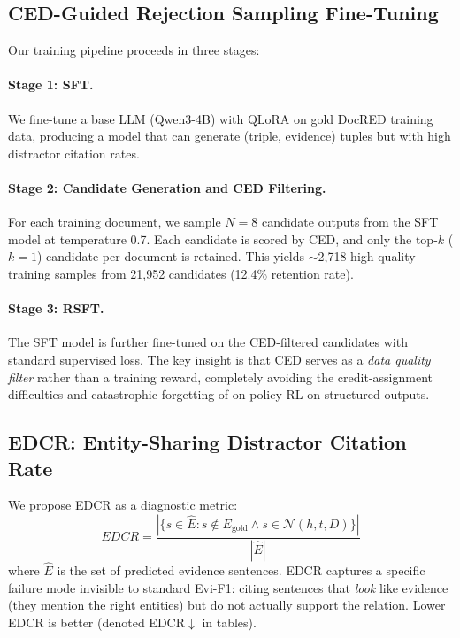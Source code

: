 \documentclass[11pt,a4paper]{article}
\newcommand{\ced}{CED}
\newcommand{\edcr}{EDCR}
\newcommand{\rsft}{RSFT}
\begin{document}
\subsection{\ced{}-Guided Rejection Sampling Fine-Tuning}

Our training pipeline proceeds in three stages:

\paragraph{Stage 1: SFT.}
We fine-tune a base LLM (Qwen3-4B) with QLoRA on gold DocRED training data, producing a model that can generate (triple, evidence) tuples but with high distractor citation rates.

\paragraph{Stage 2: Candidate Generation and \ced{} Filtering.}
For each training document, we sample $N=8$ candidate outputs from the SFT model at temperature 0.7.
Each candidate is scored by \ced{}, and only the top-$k$ ($k=1$) candidate per document is retained.
This yields ${\sim}$2,718 high-quality training samples from 21,952 candidates (12.4\% retention rate).

\paragraph{Stage 3: \rsft{}.}
The SFT model is further fine-tuned on the \ced{}-filtered candidates with standard supervised loss.
The key insight is that \ced{} serves as a \emph{data quality filter} rather than a training reward, completely avoiding the credit-assignment difficulties and catastrophic forgetting of on-policy RL on structured outputs.

\subsection{\edcr{}: Entity-Sharing Distractor Citation Rate}
\label{sec:edcr}

We propose \edcr{} as a diagnostic metric:
\begin{equation}
\edcr{} = \frac{|\{s \in \hat{E} : s \notin E_{\text{gold}} \wedge s \in \mathcal{N}(h,t,D)\}|}{|\hat{E}|}
\end{equation}
where $\hat{E}$ is the set of predicted evidence sentences.
\edcr{} captures a specific failure mode invisible to standard Evi-F1: citing sentences that \emph{look} like evidence (they mention the right entities) but do not actually support the relation.
Lower \edcr{} is better (denoted \edcr{}$\downarrow$ in tables).
\end{document}
